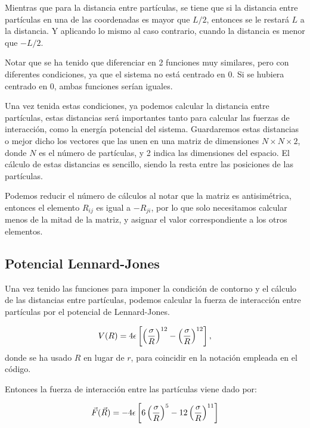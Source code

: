 \documentclass[11pt, twoside]{article} %
\begin{document}
Mientras que para la distancia entre partículas, se tiene que si la distancia entre
partículas en una de las coordenadas es mayor que $L/2$, entonces se le restará 
$L$ a la distancia. Y aplicando lo mismo al caso contrario, cuando la distancia es
menor que $-L/2$.

Notar que se ha tenido que diferenciar en 2 funciones muy similares, pero con diferentes
condiciones, ya que el sistema no está centrado en 0. Si se hubiera centrado en 0, 
ambas funciones serían iguales.

Una vez tenida estas condiciones, ya podemos calcular la distancia entre partículas,
estas distancias será importantes tanto para calcular las fuerzas de interacción, como 
la energía potencial del sistema. Guardaremos estas distancias o mejor dicho los vectores que las unen en una matriz 
de dimensiones $N\times N\times 2$, donde $N$ es el número de partículas, y 2 indica
las dimensiones del espacio. El cálculo de estas distancias es sencillo, siendo la
resta entre las posiciones de las partículas. 

Podemos reducir el número de cálculos al notar que la matriz es antisimétrica, entonces el 
elemento $R_{ij}$ es igual a $-R_{ji}$, por lo que solo necesitamos calcular menos de 
la mitad de la matriz, y asignar el valor correspondiente a los otros elementos.

\subsection{Potencial Lennard-Jones}

Una vez tenido las funciones para imponer la condición de contorno y el cálculo de 
las distancias entre partículas, podemos calcular la fuerza de interacción entre 
partículas por el potencial de Lennard-Jones.

\begin{equation}
    V(R) = 4\epsilon\left[\left(\frac{\sigma}{R}\right)^{12}-
        \left(\frac{\sigma}{R}\right)^{12}\right],
    \label{eq:Lennard_Jones_potential}
\end{equation}
donde se ha usado $R$ en lugar de $r$, para coincidir en la notación empleada en 
el código.

\vspace{3mm}

Entonces la fuerza de interacción entre las partículas viene dado por:

\begin{equation}
    \vec{F}(\vec{R}) =  - 4\epsilon\left[6\left(\frac{\sigma}{R}\right)^{5}-
    12\left(\frac{\sigma}{R}\right)^{11}\right]
\end{equation}
\end{document}
